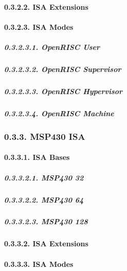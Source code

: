 \documentclass[
]{article}
\begin{document}
\hypertarget{isa-extensions-1}{%
\paragraph{0.3.2.2. ISA Extensions}\label{isa-extensions-1}}

\hypertarget{isa-modes-1}{%
\paragraph{0.3.2.3. ISA Modes}\label{isa-modes-1}}

\hypertarget{openrisc-user}{%
\subparagraph{0.3.2.3.1. OpenRISC User}\label{openrisc-user}}

\hypertarget{openrisc-supervisor}{%
\subparagraph{0.3.2.3.2. OpenRISC
Supervisor}\label{openrisc-supervisor}}

\hypertarget{openrisc-hypervisor}{%
\subparagraph{0.3.2.3.3. OpenRISC
Hypervisor}\label{openrisc-hypervisor}}

\hypertarget{openrisc-machine}{%
\subparagraph{0.3.2.3.4. OpenRISC Machine}\label{openrisc-machine}}

\hypertarget{msp430-isa}{%
\subsubsection{0.3.3. MSP430 ISA}\label{msp430-isa}}

\hypertarget{isa-bases-2}{%
\paragraph{0.3.3.1. ISA Bases}\label{isa-bases-2}}

\hypertarget{msp430-32}{%
\subparagraph{0.3.3.2.1. MSP430 32}\label{msp430-32}}

\hypertarget{msp430-64}{%
\subparagraph{0.3.3.2.2. MSP430 64}\label{msp430-64}}

\hypertarget{msp430-128}{%
\subparagraph{0.3.3.2.3. MSP430 128}\label{msp430-128}}

\hypertarget{isa-extensions-2}{%
\paragraph{0.3.3.2. ISA Extensions}\label{isa-extensions-2}}

\hypertarget{isa-modes-2}{%
\paragraph{0.3.3.3. ISA Modes}\label{isa-modes-2}}
\end{document}
